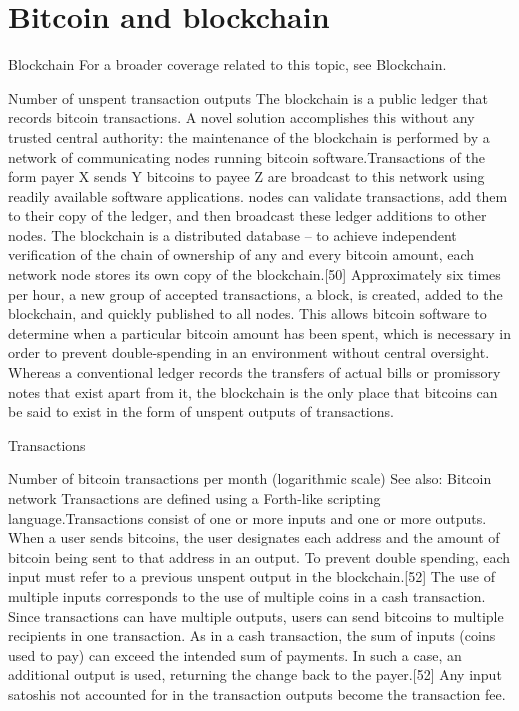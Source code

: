 \documentclass[
  digital, %
  table,   %
  lof,     %
  lot,     %
  oneside
]{fithesis3}
\begin{document}
\section{Bitcoin and blockchain}
Blockchain
For a broader coverage related to this topic, see Blockchain.

Number of unspent transaction outputs
The blockchain is a public ledger that records bitcoin transactions.
A novel solution accomplishes this without any trusted central authority: the maintenance of the blockchain is performed by a network of communicating nodes
running bitcoin software.Transactions of the form payer X sends Y bitcoins to payee Z are broadcast to this network using readily available software applications.
nodes can validate transactions, add them to their copy of the ledger, and then broadcast these ledger additions to other nodes. The blockchain is a distributed database – to achieve independent verification of the chain of ownership 
of any and every bitcoin amount, each network node stores its own copy of the blockchain.[50] Approximately six times per hour, a new group of accepted transactions, a block, is created, added to the blockchain, and quickly published to all nodes.
This allows bitcoin software to determine when a particular bitcoin amount has been spent, which is necessary in order to prevent double-spending in an environment without central oversight. 
Whereas a conventional ledger records the transfers of actual bills or promissory notes that exist apart from it, the blockchain is the only place that bitcoins can be said to exist in the form of unspent outputs of transactions.

Transactions

Number of bitcoin transactions per month (logarithmic scale)
See also: Bitcoin network
Transactions are defined using a Forth-like scripting language.Transactions consist of one or more inputs and one or more outputs.
When a user sends bitcoins, the user designates each address and the amount of bitcoin being sent to that address in an output. 
To prevent double spending, each input must refer to a previous unspent output in the blockchain.[52] The use of multiple inputs corresponds to the use of multiple coins in a cash transaction.
Since transactions can have multiple outputs, users can send bitcoins to multiple recipients in one transaction. As in a cash transaction, the sum of inputs (coins used to pay) can exceed the intended sum of payments.
In such a case, an additional output is used, returning the change back to the payer.[52] Any input satoshis not accounted for in the transaction outputs become the transaction fee.
\end{document}
